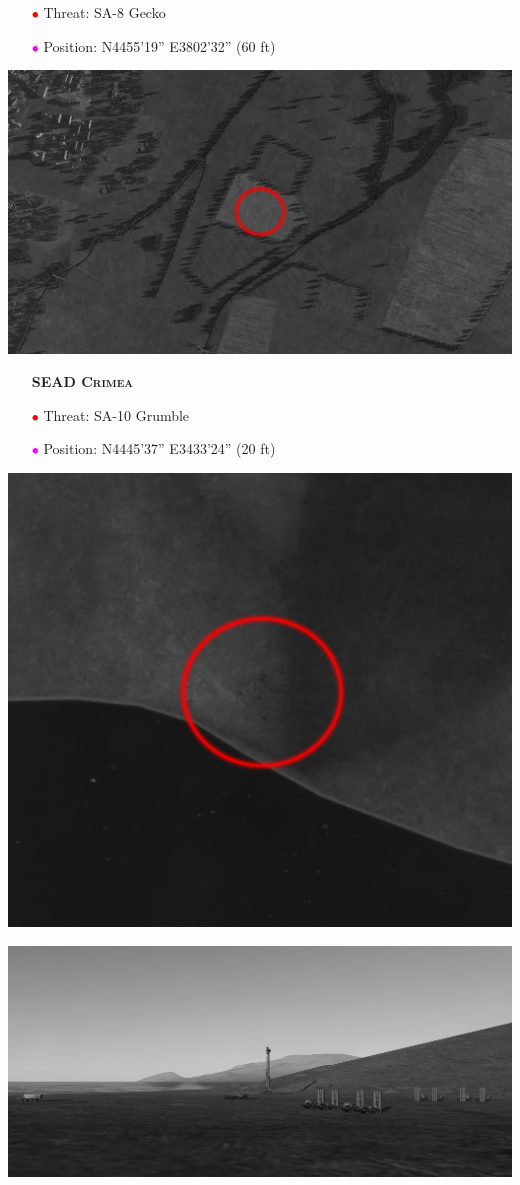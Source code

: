 \documentclass[a4paper,12pt,dvipsnames]{letter}
\newcommand{\Deg}{\textdegree{}}
\newcommand{\DMS}[3]{#1\Deg#2'#3''}
\newcommand{\myHead}[1]{{\LARGE\textsc{\textbf{#1}}}}
\newcommand{\ri}{\textcolor{Red}{$\bullet$\;}}
\newcommand{\mi}{\textcolor{Magenta}{$\bullet$\;}}
\begin{document}
{\begin{center}
\end{center}
%
\begin{itemize}
 \item[\ri] Threat: SA-8 Gecko
 \item[\mi] Position: N\DMS{44}{55}{19} E\DMS{38}{02}{32} (60 ft)
\end{itemize}
%
\begin{center}
\includegraphics[width=0.7\linewidth]{../_kneeboard/SA8_Sat.png}
\end{center}
%
\newpage
\begin{itemize}
 \item[] \myHead{SEAD Crimea}
 \item[\ri] Threat: SA-10 Grumble
 \item[\mi] Position: N\DMS{44}{45}{37} E\DMS{34}{33}{24} (20 ft)
\end{itemize}
\begin{center}
\includegraphics[width=0.7\linewidth]{../_kneeboard/SA10_01.png}
\end{center}
\vspace{1em}
\begin{center}
\includegraphics[width=0.7\linewidth]{../_kneeboard/SA10_02.png}
\end{center}
% 
}
\end{document}
